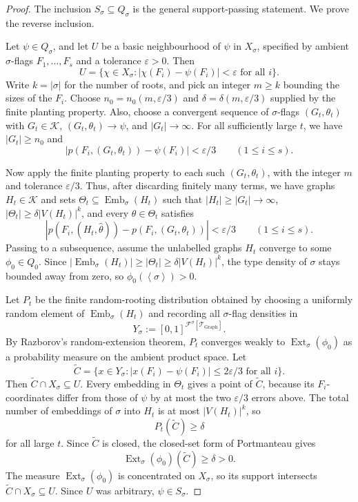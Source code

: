 \documentclass[11pt]{article}
\theoremstyle{definition}
\newcommand{\F}{\mathcal{F}}
\newcommand{\K}{\mathcal{K}}
\newcommand{\T}{\mathcal{T}}
\newcommand{\Emb}{\operatorname{Emb}}
\newcommand{\Ext}{\operatorname{Ext}}
\newcommand{\brak}[1]{\left\langle #1\right\rangle}
\newcommand{\eps}{\varepsilon}
\begin{document}
\begin{proof}
The inclusion $S_\sigma\subseteq Q_\sigma$ is the general support-passing
statement.  We prove the reverse inclusion.

Let $\psi\in Q_\sigma$, and let $U$ be a basic neighbourhood of $\psi$ in
$X_\sigma$, specified by ambient $\sigma$-flags $F_1,\ldots,F_s$ and a tolerance
$\eps>0$.  Then
\[
  U=
  \{\chi\in X_\sigma:
    |\chi(F_i)-\psi(F_i)|<\eps\text{ for all }i\}.
\]
Write $k=|\sigma|$ for the number of roots, and pick an integer $m\ge k$
bounding the sizes of the $F_i$.
Choose $n_0=n_0(m,\eps/3)$ and $\delta=\delta(m,\eps/3)$ supplied by the finite
planting property.  Also, choose a convergent sequence of $\sigma$-flags
$(G_t,\theta_t)$ with $G_t\in\K$, $(G_t,\theta_t)\to\psi$, and $|G_t|\to\infty$.
For all sufficiently large $t$, we have $|G_t|\ge n_0$ and
\[
  |p(F_i,(G_t,\theta_t))-\psi(F_i)|<\eps/3
  \qquad(1\le i\le s).
\]

Now apply the finite planting property to each such $(G_t,\theta_t)$, with the integer
$m$ and tolerance $\eps/3$.  Thus, after discarding finitely many terms, we have
graphs $H_t\in\K$ and sets $\Theta_t\subseteq\Emb_\sigma(H_t)$ such that
$|H_t|\ge |G_t|\to\infty$, $|\Theta_t|\ge\delta |V(H_t)|^k$, and every
$\widehat\theta\in\Theta_t$ satisfies
\[
  |p(F_i,(H_t,\widehat\theta))-p(F_i,(G_t,\theta_t))|<\eps/3
  \qquad(1\le i\le s).
\]
Passing to a subsequence, assume the unlabelled graphs $H_t$ converge to some
$\phi_0\in Q_0$.  Since $|\Emb_\sigma(H_t)|\ge |\Theta_t|\ge\delta |V(H_t)|^k$,
the type density of $\sigma$ stays bounded away from zero, so
$\phi_0(\brak\sigma)>0$.

Let $P_t$ be the finite random-rooting distribution obtained by choosing a uniformly
random element of $\Emb_\sigma(H_t)$ and recording all $\sigma$-flag densities in
\[
  Y_\sigma:=[0,1]^{\F^\sigma[\T_{\mathrm{Graph}}]}.
\]
By Razborov's random-extension theorem, $P_t$ converges weakly to
$\Ext_\sigma(\phi_0)$ as a probability measure on the ambient product space.  Let
\[
  \widetilde C=
  \{x\in Y_\sigma:
    |x(F_i)-\psi(F_i)|\le 2\eps/3\text{ for all }i\}.
\]
Then $\widetilde C\cap X_\sigma\subseteq U$.  Every embedding in $\Theta_t$ gives a
point of $\widetilde C$, because its $F_i$-coordinates differ from those of $\psi$ by
at most the two $\eps/3$ errors above.  The total number of embeddings of $\sigma$ into
$H_t$ is at most $|V(H_t)|^k$, so
\[
  P_t(\widetilde C)\ge\delta
\]
for all large $t$.  Since $\widetilde C$ is closed, the closed-set form of
Portmanteau gives
\[
  \Ext_\sigma(\phi_0)(\widetilde C)\ge\delta>0.
\]
The measure $\Ext_\sigma(\phi_0)$ is concentrated on $X_\sigma$, so its support
intersects $\widetilde C\cap X_\sigma\subseteq U$.  Since $U$ was arbitrary,
$\psi\in S_\sigma$.
\end{proof}
\end{document}
